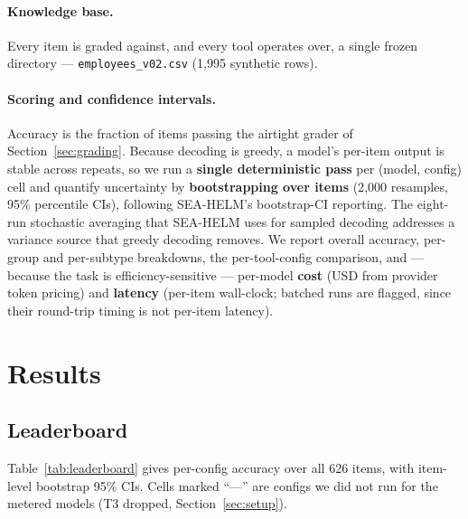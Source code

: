 \documentclass[11pt]{article}
\begin{document}
\paragraph{Knowledge base.} Every item is graded against, and every tool operates over, a single frozen
directory --- \texttt{employees\_v02.csv} (1{,}995 synthetic rows).

\paragraph{Scoring and confidence intervals.} Accuracy is the fraction of items passing the airtight
grader of Section~\ref{sec:grading}. Because decoding is greedy, a model's per-item output is stable
across repeats, so we run a \textbf{single deterministic pass} per (model, config) cell and quantify
uncertainty by \textbf{bootstrapping over items} (2{,}000 resamples, 95\% percentile CIs), following
SEA-HELM's bootstrap-CI reporting. The eight-run stochastic averaging that SEA-HELM uses for sampled
decoding addresses a variance source that greedy decoding removes. We report overall accuracy,
per-group and per-subtype breakdowns, the per-tool-config comparison, and --- because the task is
efficiency-sensitive --- per-model \textbf{cost} (USD from provider token pricing) and \textbf{latency}
(per-item wall-clock; batched runs are flagged, since their round-trip timing is not per-item latency).

\section{Results}
\label{sec:results}

\subsection{Leaderboard}

Table~\ref{tab:leaderboard} gives per-config accuracy over all 626 items, with item-level bootstrap
95\% CIs. Cells marked ``---'' are configs we did not run for the metered models (T3 dropped,
Section~\ref{sec:setup}).
\end{document}
